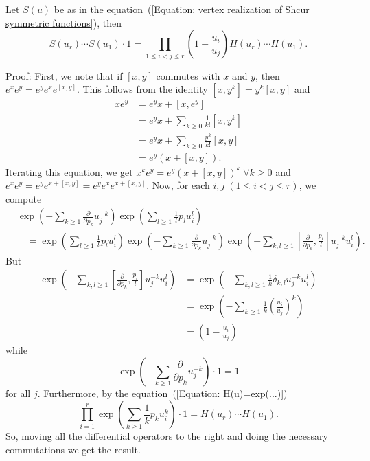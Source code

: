\begin{dang}
    \begin{theorem}\cite{jing2024characters}
    Let $S(u)$ be as in the equation~(\ref{Equation: vertex realization of Shcur symmetric functions}), then
        \begin{equation}\label{equation: Schur generating and homogeneous generatings}
            S(u_r)\cdots S(u_1)\cdot1=\prod_{1\leq i<j\leq r}\left(1-\frac{u_i}{u_j}\right)H(u_r)\cdots H(u_1).
        \end{equation}
    \end{theorem}
\end{dang}
Proof: First, we note that if $[x,y]$ commutes with $x$ and $y$, then $e^xe^y=e^ye^xe^{[x,y]}$. This follows from the identity $[x,y^k]=y^k[x,y]$ and
\begin{equation}
    \begin{split}
        xe^y &= e^yx+[x,e^y]\\
        &=e^yx+\sum_{k\geq0}\frac{1}{k!}[x,y^k]\\
        &=e^yx+\sum_{k\geq0}\frac{y^k}{k!}[x,y]\\
        &=e^y(x+[x,y]).
    \end{split}
\end{equation}
Iterating this equation, we get $x^ke^y=e^y(x+[x,y])^k\;\forall k\geq0$ and $e^xe^y=e^ye^{x+[x,y]}=e^ye^xe^{x+[x,y]}$. Now, for each $i,j\;(1\leq i<j\leq r)$, we compute
\begin{equation}
    \begin{split}
        &\exp\left(-\sum_{k\geq 1}\frac{\partial}{\partial p_k}u_j^{-k}\right)  \exp\left(\sum_{l\geq 1}\frac{1}{l}p_lu_i^{l}\right)\\
        &\quad=\exp\left(\sum_{l\geq 1}\frac{1}{l}p_lu_i^{l}\right) \exp\left(-\sum_{k\geq 1}\frac{\partial}{\partial p_k}u_j^{-k}\right)\exp\left(-\sum_{k,l\geq 1}\left[\frac{\partial}{\partial p_k},\frac{p_l}{l}\right]u_j^{-k}u_i^l\right).
    \end{split}
\end{equation}
But 
\begin{equation}
\begin{split}
      \exp\left(-\sum_{k,l\geq 1}\left[\frac{\partial}{\partial p_k},\frac{p_l}{l}\right]u_j^{-k}u_i^l\right) &=  \exp\left(-\sum_{k,l\geq 1}\frac{1}{k}\delta_{k,l}u_j^{-k}u_i^l\right)\\
      &=\exp\left(-\sum_{k\geq 1}\frac{1}{k}\left(\frac{u_i}{u_j}\right)^k\right)\\
      &=\left(1-\frac{u_i}{u_j}\right)
\end{split}
\end{equation}
while
\begin{equation}
    \exp\left(-\sum_{k\geq 1}\frac{\partial}{\partial p_k}u_j^{-k}\right)\cdot1=1
\end{equation}
for all $j$. Furthermore, by the equation~(\ref{Equation: H(u)=exp(...)})
\begin{equation}
   \prod_{i=1}^r \exp\left(\sum_{k\geq 1}\frac{1}{k}p_ku_i^{k}\right)\cdot 1=H(u_r)\cdots H(u_1).
\end{equation}
So, moving all the differential operators to the right and doing the necessary commutations we get the result.

